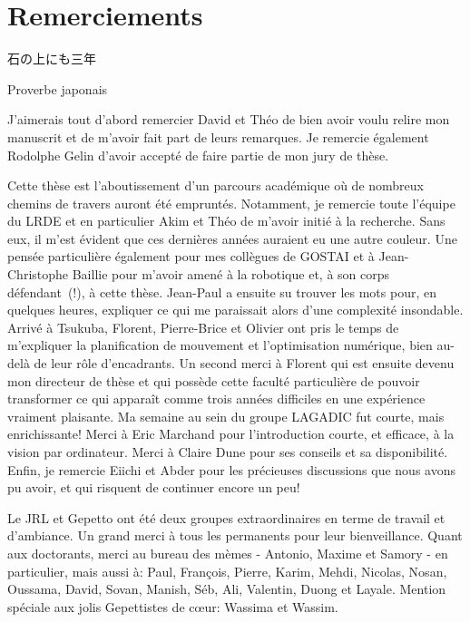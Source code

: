 \chapter*{Remerciements}\label{chap:merci}

\epigraph{\begin{CJK*}{UTF8}{min}%
石の上にも三年%
\end{CJK*}}{Proverbe japonais}

\vspace{1cm}

J'aimerais tout d'abord remercier David et Théo de bien avoir voulu
relire mon manuscrit et de m'avoir fait part de leurs remarques. Je
remercie également Rodolphe Gelin d'avoir accepté de faire partie
de mon jury de thèse.


Cette thèse est l'aboutissement d'un parcours académique où de
nombreux chemins de travers auront été empruntés. Notamment, je
remercie toute l'équipe du LRDE et en particulier Akim et Théo de
m'avoir initié à la recherche. Sans eux, il m'est évident que ces
dernières années auraient eu une autre couleur. Une pensée
particulière également pour mes collègues de GOSTAI et à
Jean-Christophe Baillie pour m'avoir amené à la robotique et, à son
corps défendant~(!), à cette thèse. Jean-Paul a ensuite su trouver les
mots pour, en quelques heures, expliquer ce qui me paraissait alors
d'une complexité insondable. Arrivé à Tsukuba, Florent, Pierre-Brice et
Olivier ont pris le temps de m'expliquer la planification de mouvement
et l'optimisation numérique, bien au-delà de leur rôle
d'encadrants. Un second merci à Florent qui est ensuite devenu mon
directeur de thèse et qui possède cette faculté particulière de
pouvoir transformer ce qui apparaît comme trois années difficiles en
une expérience vraiment plaisante. Ma semaine au sein du groupe
LAGADIC fut courte, mais enrichissante! Merci à Eric Marchand pour
l'introduction courte, et efficace, à la vision par ordinateur. Merci
à Claire Dune pour ses conseils et sa disponibilité. Enfin, je
remercie Eiichi et Abder pour les précieuses discussions que nous
avons pu avoir, et qui risquent de continuer encore un peu!


Le JRL et Gepetto ont été deux groupes extraordinaires en terme de
travail et d'ambiance. Un grand merci à tous les permanents pour leur
bienveillance. Quant aux doctorants, merci au bureau des mèmes -
Antonio, Maxime et Samory - en particulier, mais aussi à: Paul,
François, Pierre, Karim, Mehdi, Nicolas, Nosan, Oussama, David, Sovan,
Manish, Séb, Ali, Valentin, Duong et Layale. Mention spéciale aux
jolis Gepettistes de c\oe ur: Wassima et Wassim.


